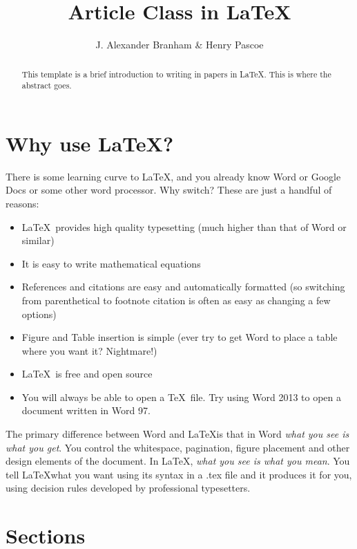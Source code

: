 \documentclass[12pt]{article} %
\title{Article Class in \LaTeX} %
\author{ J. Alexander Branham \& Henry Pascoe} %
\begin{document}

\maketitle %

\begin{abstract}
  This template is a brief introduction to writing in papers in \LaTeX. This is where the abstract goes. 
\end{abstract}

\section{Why use \LaTeX?}

There is some learning curve to \LaTeX, and you already
know Word or Google Docs or some other word processor. Why switch?
These are just a handful of reasons: 

\begin{itemize}
\item \LaTeX~provides high quality typesetting (much higher than that
  of Word or similar)
\item It is easy to write mathematical equations 
\item References and citations are easy and automatically formatted
  (so switching from parenthetical to footnote citation is often as easy as
  changing a few options)
\item Figure and Table insertion is simple (ever try to get Word to
  place a table where you want it? Nightmare!)
\item \LaTeX~is free and open source
\item You will always be able to open a \TeX~file. Try using Word 2013
  to open a document written in Word 97. 
\end{itemize}

The primary difference between Word  and \LaTeX is that in Word \emph{what you see is what you get}. You control the whitespace, pagination, figure placement and other design elements of the document. In \LaTeX, \emph{what you see is what you mean}. You tell \LaTeX what you want using its syntax in a .tex file and it produces it for you, using decision rules developed by professional typesetters. 

\doublespacing%

\section{Sections}
\end{document}
